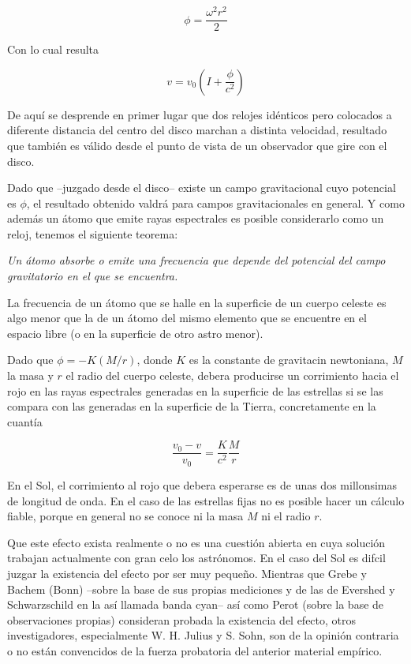 \documentclass[spanish]{book}
\begin{document}
\[\phi=\frac{\omega^{2}r^{2}}{2}\]

\noindent Con lo cual resulta

\[v=v_{0}\left(I+\frac{\phi}{c^{2}}\right)\]

De aquí se desprende en primer lugar que dos relojes idénticos pero colocados a
diferente distancia del centro del disco marchan a distinta velocidad, resultado que
también es válido desde el punto de vista de un observador que gire con el disco.

Dado que --juzgado desde el disco-- existe un campo gravitacional cuyo
potencial es $\phi$, el resultado obtenido valdrá para campos gravitacionales en general. Y
como además un átomo que emite rayas espectrales es posible considerarlo como un
reloj, tenemos el siguiente teorema:

\textit{Un átomo absorbe o emite una frecuencia que depende del potencial del campo gravitatorio
en el que se encuentra.}

La frecuencia de un átomo que se halle en la superficie de un cuerpo celeste es algo
menor que la de un átomo del mismo elemento que se encuentre en el espacio libre (o
en la superficie de otro astro menor). 

Dado que $\phi=-K(M/r)$, donde $K$ es la constante de gravitacin newtoniana, $M$ la masa y $r$ 
el radio del cuerpo celeste, debera producirse un corrimiento hacia el rojo en las rayas espectrales
generadas en la superficie de las estrellas si se las compara con las generadas en la
superficie de la Tierra, concretamente en la cuantía

\[\frac{v_{0}-v}{v_{0}}=\frac{K}{c^{2}}\frac{M}{r}\]

En el Sol, el corrimiento al rojo que debera esperarse es de unas dos millonsimas de
longitud de onda. En el caso de las estrellas fijas no es posible hacer un cálculo fiable,
porque en general no se conoce ni la masa $M$ ni el radio $r$.

Que este efecto exista realmente o no es una cuestión abierta en cuya solución
trabajan actualmente con gran celo los astrónomos. En el caso del Sol es difcil juzgar
la existencia del efecto por ser muy pequeño. Mientras que Grebe y Bachem (Bonn)
--sobre la base de sus propias mediciones y de las de Evershed y Schwarzschild en la
así llamada banda cyan-- así como Perot (sobre la base de observaciones propias)
consideran probada la existencia del efecto, otros investigadores, especialmente W. H.
Julius y S. Sohn, son de la opinión contraria o no están convencidos de la fuerza
probatoria del anterior material empírico.
\end{document}
